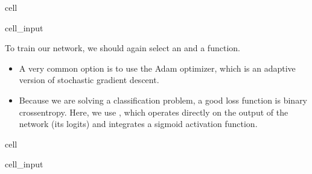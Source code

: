 \documentclass[letterpaper,10pt,english]{jupyterBook}
\begin{document}
\begin{sphinxuseclass}{cell}\begin{sphinxVerbatimInput}

\begin{sphinxuseclass}{cell_input}
\begin{sphinxVerbatim}[commandchars=\\\{\}]
  
\end{sphinxVerbatim}

\end{sphinxuseclass}\end{sphinxVerbatimInput}

\end{sphinxuseclass}
\sphinxAtStartPar
To train our network, we should again select an  and a  function.
\begin{itemize}
\item {} 
\sphinxAtStartPar
A very common option is to use the Adam optimizer, which is an adaptive version of stochastic gradient descent.

\item {} 
\sphinxAtStartPar
Because we are solving a classification problem, a good loss function is binary cross\sphinxhyphen{}entropy. Here, we use , which operates directly on the output of the network (its logits) and integrates a sigmoid activation function.

\end{itemize}

\begin{sphinxuseclass}{cell}\begin{sphinxVerbatimInput}

\begin{sphinxuseclass}{cell_input}
\begin{sphinxVerbatim}[commandchars=\\\{\}]
    
  
\end{sphinxVerbatim}

\end{sphinxuseclass}\end{sphinxVerbatimInput}

\end{sphinxuseclass}
\end{document}
